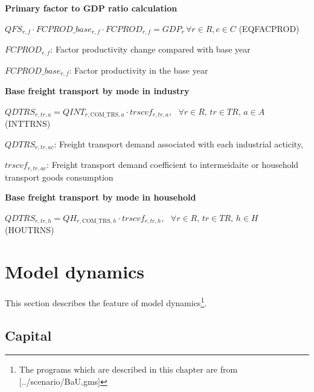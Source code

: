 \documentclass[10pt,a4paper,titlepage,dvipdfmx]{book}
\begin{document}
\begin{flushleft}\textbf{Primary factor to GDP ratio calculation}\end{flushleft}


\begin{center}$QFS_{r,f}\cdot FCPROD\_ base_{r,f}\cdot FCPROD_{r,f}=GDP_{r}\,\forall r\in R,c\in C$ (EQFACPROD)
\end{center}

\begin{flushleft}
$FCPROD_{r,f}$: Factor productivity change compared with base year

$FCPROD\_base_{r,f}$: Factor productivity in the base year
\end{flushleft}

\begin{flushleft}\textbf{Base freight transport by mode in industry}\end{flushleft}


\begin{center}$QDTRS_{r,tr,a}=QINT_{r,\mathrm{COM}\_ \mathrm{TRS},a}\cdot trscvf_{r,tr,a},\,\,\,\,\forall r\in R,\,tr\in TR,\,a\in A$ (INTTRNS)
\end{center}

\begin{flushleft}
$QDTRS_{r,tr,ac}$: Freight transport demand associated with each industrial acticity,

$trscvf_{r,tr,ac}$: Freight transport demand coefficient to intermeidaite or household transport goods consumption
\end{flushleft}

\begin{flushleft}\textbf{Base freight transport by mode in household}\end{flushleft}


\begin{center}$QDTRS_{r,tr,h}=QH_{r,\mathrm{COM}\_ \mathrm{TRS},h}\cdot trscvf_{r,tr,h},\,\,\,\,\forall r\in R,\,tr\in TR,\,h\in H$ (HOUTRNS)
\end{center}

\chapter{\label{chp:ModDyn}Model dynamics}

This section describes the feature of model dynamics\footnote{The programs which are described in this chapter are from [../scenario/BaU.gms]}.

\section{\label{sec:Capital}Capital}
\end{document}
